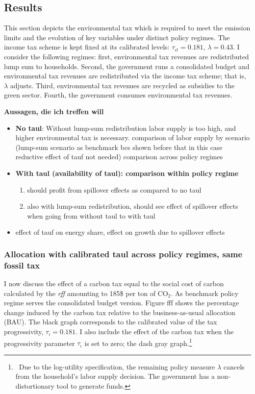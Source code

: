 \subsection{Results }
This section depicts the environmental tax which is required to meet the emission limits and the evolution of key variables under distinct policy regimes. The income tax scheme is kept fixed at its calibrated levels: $\tau_{\iota t}=0.181$, $\lambda=0.43$.
I consider the following regimes: first, environmental tax revenues are redistributed lump sum to households. Second, the government runs a consolidated budget and environmental tax revenues are redistributed via the income tax scheme; that is, $\lambda$ adjusts. Third, environmental tax revenues are recycled as subsidies to the green sector. Fourth, the government consumes environmental tax revenues. 

\textbf{Aussagen, die ich treffen will}
\begin{itemize}
	\item \textbf{No taul}:  Without lump-sum redistribution labor supply is too high, and higher environmental tax is necessary.  comparison of labor supply by scenario (lump-sum scenario as benchmark bcs shown before that in this case reductive effect of tauf not needed)
	\ar comparison across policy regimes
	\item \textbf{With taul (availability of taul): comparison within policy regime}
	\begin{enumerate}
	\item should profit from spillover effects as compared to no taul
 	\item 
	also with lump-sum redistribution, should see effect of spillover effects when going from without taul to with taul	
	\end{enumerate}
	\item effect of tauf on energy share, effect on growth due to spillover effects
\end{itemize}


\subsubsection{Allocation with calibrated taul across policy regimes, same fossil tax}

I now discuss the effect of a carbon tax equal to the social cost of carbon calculated by the \textit{rff} amounting to 185\$ per ton of CO$_2$. As benchmark policy regime serves the consolidated budget version. 
Figure fff shows the percentage change induced by the carbon tax relative to the business-as-usual allocation (BAU). The black graph corresponds to the calibrated value of the tax progressivity, $\tau_{\iota}=0.181$. I also include the effect of the carbon tax when the progressivity parameter $\tau_\iota$ is set to zero; the dash gray graph.\footnote{\ Due to the log-utility specification, the remaining policy measure $\lambda$ cancels from the household's labor supply decision. The government has a non-distortionary tool to generate funds.} 

